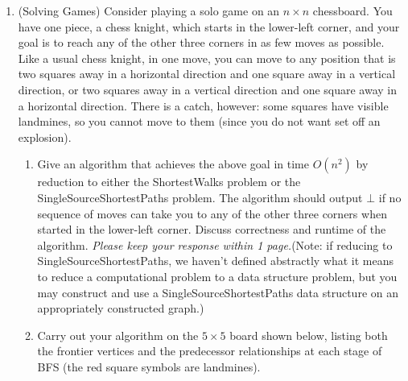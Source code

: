 \documentclass[11pt]{article}
\begin{document}
\begin{enumerate}
\emph{Please keep your response within 1 page.}

\item  (Solving Games) 
     Consider playing a solo game on an $n\times n$ chessboard.  You have one piece, a chess knight, which starts in the lower-left corner, and your goal is to reach any of the other three corners in as few moves as possible.  Like a usual chess knight, in one move, you can move to any position that is two squares away in a horizontal direction and one square away in a vertical direction, or two squares away in a vertical direction and one square away in a horizontal direction.  There is a catch, however: some squares have visible landmines, so you cannot move to them (since you do not want set off an explosion). \


\begin{enumerate}
\item Give an algorithm that achieves the above goal in time $O(n^2)$ by reduction to either the ShortestWalks problem or the SingleSourceShortestPaths problem. The algorithm should output $\bot$ if no sequence of moves can take you to any of the other three corners when started in the lower-left corner. Discuss correctness and runtime of the algorithm. \emph{Please keep your response within 1 page.}(Note: if reducing to SingleSourceShortestPaths, we haven't defined abstractly what it means to reduce a computational problem to a data structure problem, but you may construct and use a SingleSourceShortestPaths data structure on an appropriately constructed graph.)


    \item Carry out your algorithm on the $5\times 5$ board shown below, listing both the frontier vertices and the predecessor relationships at each stage of BFS (the red square symbols are landmines).

    \begin{figure} [H]
    \centering
\end{figure}
\end{enumerate}
\end{enumerate}
\end{document}
